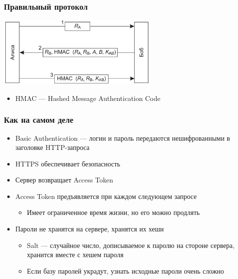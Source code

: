 \documentclass{../cscslides}
\begin{document}
    \begin{frame}
        \frametitle{Правильный протокол}
        \begin{center}
            \includegraphics[width=0.6\textwidth]{hmacs.png}
        \end{center}
        \begin{itemize}
            \item HMAC --- Hashed Message Authentication Code
        \end{itemize}
    \end{frame}

    \begin{frame}
        \frametitle{Как на самом деле}
        \begin{itemize}
            \item Basic Authentication --- логин и пароль передаются нешифрованными в заголовке HTTP-запроса
            \item HTTPS обеспечивает безопасность
            \item Сервер возвращает Access Token
            \item Access Token предъявляется при каждом следующем запросе
            \begin{itemize}
                \item Имеет ограниченное время жизни, но его можно продлять
            \end{itemize}
            \item Пароли не хранятся на сервере, хранятся их хеши
            \begin{itemize}
                \item Salt --- случайное число, дописываемое к паролю на стороне сервера, хранится вместе с хешем пароля
                \item Если базу паролей украдут, узнать исходные пароли очень сложно
            \end{itemize}
        \end{itemize}
    \end{frame}
\end{document}
